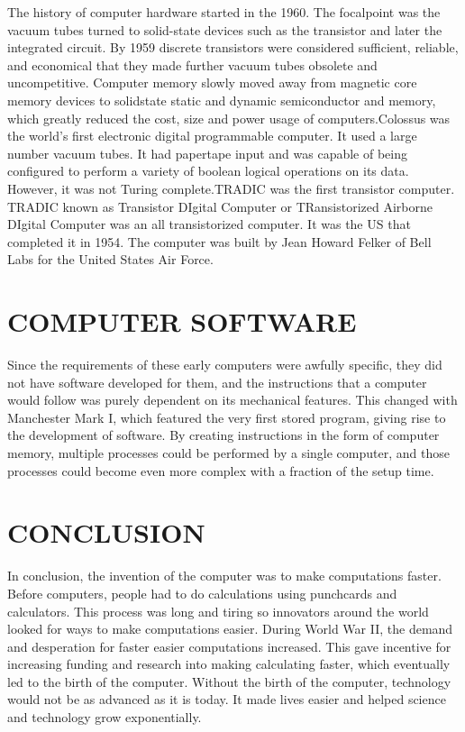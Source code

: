 \documentclass[letterpaper, 10 pt, conference]{IEEEconf}
\begin{document}
The history of computer hardware started in the 1960. The focalpoint was the  
vacuum tubes turned to solid-state devices such as the transistor and later 
the integrated circuit. By 1959 discrete transistors were considered 
sufficient, reliable, and economical that they made further vacuum tubes 
obsolete and uncompetitive. Computer memory slowly moved away from 
magnetic core memory devices to solidstate static and dynamic semiconductor and
memory, which greatly reduced the cost, size and power usage of 
computers.Colossus was the world's first electronic digital programmable 
computer. It used a large number vacuum tubes. It had papertape 
input and was capable of being configured to perform a variety of boolean 
logical operations on its data. However, it was not Turing complete.TRADIC was 
the first transistor computer. TRADIC known as Transistor DIgital Computer or 
TRansistorized Airborne DIgital Computer was an all transistorized computer. 
It was the US that completed it in 1954. The computer was built by Jean Howard 
Felker of Bell Labs for the United States Air Force. 

\section{COMPUTER SOFTWARE}
Since the requirements of these early computers were 
awfully specific, they did not have software developed 
for them, and the instructions that a computer would follow 
was purely dependent on its mechanical features. 
This changed with Manchester Mark I, which featured the 
very first stored program, giving rise to the development 
of software. By creating instructions in the form of computer 
memory, multiple processes could be performed by a single 
computer, and those processes could become even more complex 
with a fraction of the setup time.

\section{CONCLUSION}

In conclusion, the invention of the computer was to make computations faster. Before computers, people had to do calculations using punchcards and calculators. This process was long and tiring so innovators around the world looked for ways to make computations easier. During World War II, the demand and desperation for faster easier computations increased. This gave incentive for increasing funding and research into making calculating faster, which eventually led to the birth of the computer. Without the birth of the computer, technology would not be as advanced as it is today. It made lives easier and helped science and technology grow exponentially. 
\end{document}
